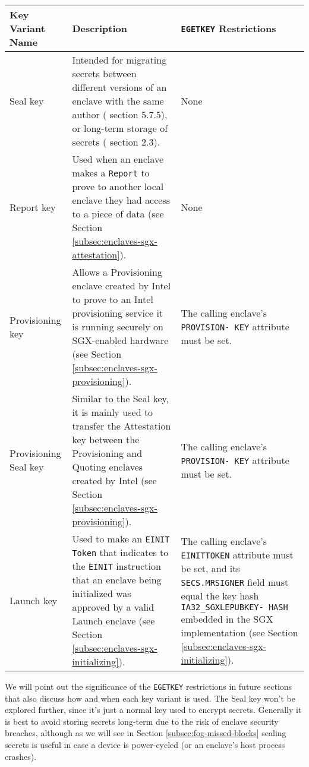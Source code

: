 \begin{tabularx}{\textwidth}{|l|X|X|}
\caption{SGX Key Variants}
\label{table:sgx-key-variants}\\
\hline
    Key Variant Name &
    Description &
    {\tt EGETKEY} Restrictions\\
\hline\hline
    Seal key &
    Intended for migrating secrets between different versions of an enclave with the same author (\cite{intel-sgx-explained-advanced} section 5.7.5), or long-term storage of secrets (\cite{sgx-epid-provisioning-attestation} section 2.3). &
    None \\
\hline
    Report key &
    Used when an enclave makes a {\tt Report} to prove to another local enclave they had access to a piece of data (see Section \ref{subsec:enclaves-sgx-attestation}). &
    None \\
\hline
    Provisioning key &
    Allows a Provisioning enclave created by Intel to prove to an Intel provisioning service it is running securely on SGX-enabled hardware (see Section \ref{subsec:enclaves-sgx-provisioning}). &
    The calling enclave's {\tt PROVISION- KEY} attribute must be set. \\
\hline
    Provisioning Seal key &
    Similar to the Seal key, it is mainly used to transfer the Attestation key between the Provisioning and Quoting enclaves created by Intel (see Section \ref{subsec:enclaves-sgx-provisioning}). &
    The calling enclave's {\tt PROVISION- KEY} attribute must be set. \\
\hline
    Launch key &
    Used to make an {\tt EINIT Token} that indicates to the {\tt EINIT} instruction that an enclave being initialized was approved by a valid Launch enclave (see Section \ref{subsec:enclaves-sgx-initializing}). &
    The calling enclave's {\tt EINITTOKEN} attribute must be set, and its {\tt SECS.MRSIGNER} field must equal the key hash {\tt IA32\_SGXLEPUBKEY- HASH} embedded in the SGX implementation (see Section \ref{subsec:enclaves-sgx-initializing}).\\
\hline
\end{tabularx}

We will point out the significance of the {\tt EGETKEY} restrictions in future sections that also discuss how and when each key variant is used. The Seal key won't be explored further, since it's just a normal key used to encrypt secrets. Generally it is best to avoid storing secrets long-term due to the risk of enclave security breaches, although as we will see in Section \ref{subsec:fog-missed-blocks} sealing secrets is useful in case a device is power-cycled (or an enclave's host process crashes).

